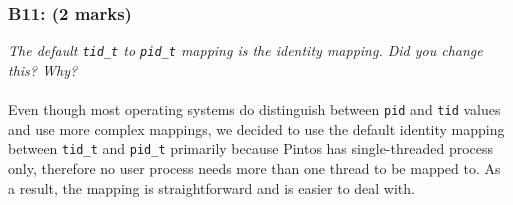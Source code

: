 \documentclass{article}
\begin{document}
\subsubsection*{B11: (2 marks) }
\textit{The default \texttt{tid\_t} to \texttt{pid\_t} mapping is the identity mapping. Did you change this? Why?}
\\ \\
Even though most operating systems do distinguish between \texttt{pid} and \texttt{tid} values and use more complex mappings, we decided to use the default identity mapping between \texttt{tid\_t} and \texttt{pid\_t} primarily because Pintos has single-threaded process only, therefore no user process needs more than one thread to be mapped to. As a result, the mapping is straightforward and is easier to deal with.
\end{document}
